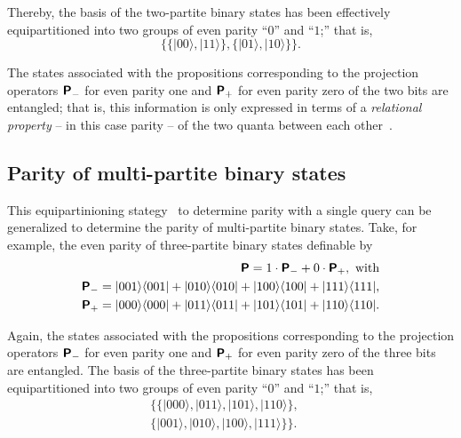 \documentclass[%
 12pt,
 reprint,
  twocolumn,
 showpacs,
 showkeys,
 preprintnumbers,
 amsmath,amssymb,
 aps,
  pra,
  longbibliography,
 ]{revtex4-1}
\begin{document}
Thereby, the basis of the two-partite binary states has been effectively equipartitioned
into two groups of even parity ``$0$'' and ``$1$;'' that is,
\begin{equation}
\big\{
   \{\vert 00 \rangle ,  \vert 11 \rangle \},
   \{\vert 01 \rangle ,  \vert 10 \rangle \}
\big\}.
\end{equation}

The states associated with the propositions
corresponding to the projection operators
$\textsf{\textbf{P}}_-$ for even parity one
and
$\textsf{\textbf{P}}_+$ for even parity zero of the two bits
are entangled;
that is, this information is only expressed in terms of a {\em relational
property} -- in this case parity -- of the two quanta between each other~\cite{Zeilinger-97,zeil-99}.


\subsection{Parity of multi-partite binary states}

This equipartinioning stategy~\cite{DonSvo01,svozil-2002-statepart-prl} to determine parity with a single query can be generalized
to determine the parity of multi-partite binary states.
Take, for example, the even parity of three-partite binary states definable by
\begin{equation}
\begin{split}
\textsf{\textbf{P}} =  1 \cdot \textsf{\textbf{P}}_- + 0 \cdot \textsf{\textbf{P}}_+, \text { with}\\
\textsf{\textbf{P}}_- =
\vert 001 \rangle \langle 001 \vert  +
\vert 010 \rangle \langle 010 \vert  +
\vert 100 \rangle \langle 100 \vert  +
\vert 111 \rangle \langle 111 \vert,\\
\textsf{\textbf{P}}_+ =
\vert 000 \rangle \langle 000 \vert  +
\vert 011 \rangle \langle 011 \vert  +
\vert 101 \rangle \langle 101 \vert  +
\vert 110 \rangle \langle 110 \vert
.
\end{split}
\end{equation}

Again, the states associated with the propositions
corresponding to the projection operators
$\textsf{\textbf{P}}_-$ for even parity one
and
$\textsf{\textbf{P}}_+$ for even parity zero of the three bits
are entangled.
The basis of the three-partite binary states has been equipartitioned
into two groups of even parity ``$0$'' and ``$1$;'' that is,
\begin{equation}
\begin{split}
\big\{
   \{\vert 000 \rangle ,
\vert 011 \rangle ,
\vert 101 \rangle ,
\vert 110 \rangle  \}, \quad
\\
   \{\vert 001 \rangle ,
\vert 010 \rangle ,
\vert 100 \rangle ,
\vert 111 \rangle  \}
\big\}.
\end{split}
\end{equation}
\end{document}
